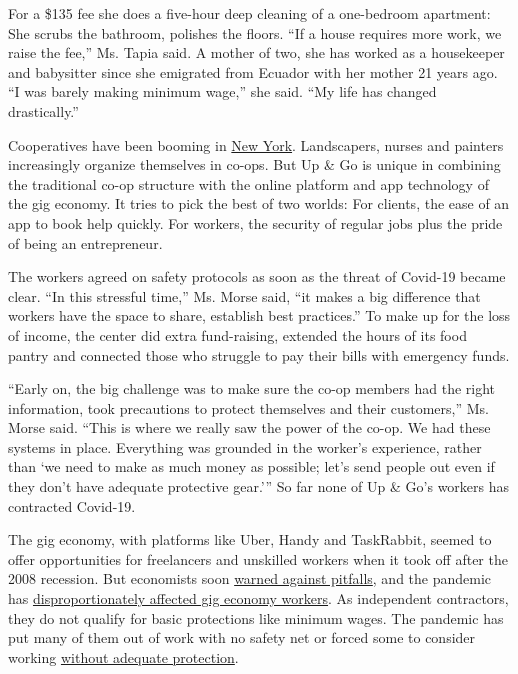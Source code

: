 For a \$135 fee she does a five-hour deep cleaning of a one-bedroom
apartment: She scrubs the bathroom, polishes the floors. ``If a house
requires more work, we raise the fee,'' Ms. Tapia said. A mother of two,
she has worked as a housekeeper and babysitter since she emigrated from
Ecuador with her mother 21 years ago. ``I was barely making minimum
wage,'' she said. ``My life has changed drastically.''

Cooperatives have been booming in
\href{https://www1.nyc.gov/nycbusiness/article/worker-cooperatives}{New
York}. Landscapers, nurses and painters increasingly organize themselves
in co-ops. But Up \& Go is unique in combining the traditional co-op
structure with the online platform and app technology of the gig
economy. It tries to pick the best of two worlds: For clients, the ease
of an app to book help quickly. For workers, the security of regular
jobs plus the pride of being an entrepreneur.

The workers agreed on safety protocols as soon as the threat of Covid-19
became clear. ``In this stressful time,'' Ms. Morse said, ``it makes a
big difference that workers have the space to share, establish best
practices.'' To make up for the loss of income, the center did extra
fund-raising, extended the hours of its food pantry and connected those
who struggle to pay their bills with emergency funds.

``Early on, the big challenge was to make sure the co-op members had the
right information, took precautions to protect themselves and their
customers,'' Ms. Morse said. ``This is where we really saw the power of
the co-op. We had these systems in place. Everything was grounded in the
worker's experience, rather than `we need to make as much money as
possible; let's send people out even if they don't have adequate
protective gear.''' So far none of Up \& Go's workers has contracted
Covid-19.

The gig economy, with platforms like Uber, Handy and TaskRabbit, seemed
to offer opportunities for freelancers and unskilled workers when it
took off after the 2008 recession. But economists soon
\href{https://www.nytimes.com/2017/04/10/opinion/the-gig-economys-false-promise.html?searchResultPosition=1}{warned
against pitfalls}, and the pandemic has
\href{https://www.nytimes.com/2020/03/18/technology/gig-economy-pandemic.html}{disproportionately
affected gig economy workers}. As independent contractors, they do not
qualify for basic protections like minimum wages. The pandemic has put
many of them out of work with no safety net or forced some to consider
working
\href{https://www.nytimes.com/2020/03/30/business/economy/coronavirus-instacart-amazon.html}{without
adequate protection}.

